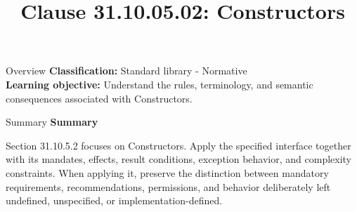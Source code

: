 \documentclass[10pt,letterpaper]{article}
\title{Clause 31.10.05.02: Constructors}
\author{}
\date{}
\begin{document}
\maketitle
\begin{CornellOverviewBox}{Overview}
\textbf{Classification:} Standard library - Normative\\[2pt]
\textbf{Learning objective:} Understand the rules, terminology, and semantic consequences associated with Constructors.
\end{CornellOverviewBox}\begin{CornellSummaryBox}{Summary}
{\sffamily\bfseries\color{Accent} Summary}\par\vspace{3pt}Section 31.10.5.2 focuses on Constructors. Apply the specified interface together with its mandates, effects, result conditions, exception behavior, and complexity constraints. When applying it, preserve the distinction between mandatory requirements, recommendations, permissions, and behavior deliberately left undefined, unspecified, or implementation-defined.
\end{CornellSummaryBox}
\end{document}
